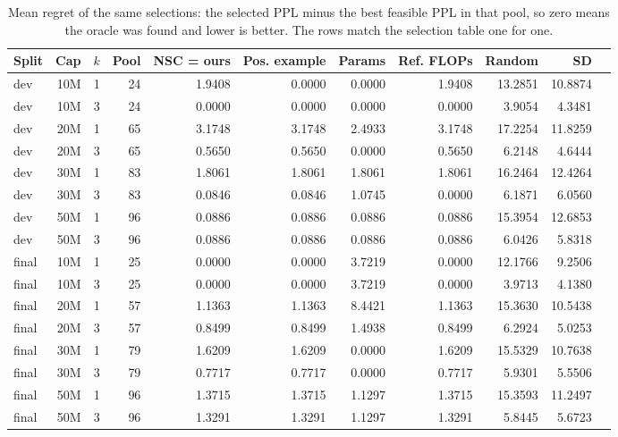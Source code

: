 \begin{table}[t]
\centering
\small
\caption{Mean regret of the same selections: the selected PPL minus the best feasible PPL in that pool, so zero means the oracle was found and lower is better. The rows match the selection table one for one.}
\label{tab:table3b}
\setlength{\tabcolsep}{4pt}
\begin{tabular}{lrrrrrrrrrr}
\toprule
Split & Cap & $k$ & Pool & NSC = ours & Pos. example & Params & Ref. FLOPs & Random & SD \\
\midrule
dev & 10M & 1 & 24 & 1.9408 & 0.0000 & 0.0000 & 1.9408 & 13.2851 & 10.8874 \\
dev & 10M & 3 & 24 & 0.0000 & 0.0000 & 0.0000 & 0.0000 & 3.9054 & 4.3481 \\
dev & 20M & 1 & 65 & 3.1748 & 3.1748 & 2.4933 & 3.1748 & 17.2254 & 11.8259 \\
dev & 20M & 3 & 65 & 0.5650 & 0.5650 & 0.0000 & 0.5650 & 6.2148 & 4.6444 \\
dev & 30M & 1 & 83 & 1.8061 & 1.8061 & 1.8061 & 1.8061 & 16.2464 & 12.4264 \\
dev & 30M & 3 & 83 & 0.0846 & 0.0846 & 1.0745 & 0.0000 & 6.1871 & 6.0560 \\
dev & 50M & 1 & 96 & 0.0886 & 0.0886 & 0.0886 & 0.0886 & 15.3954 & 12.6853 \\
dev & 50M & 3 & 96 & 0.0886 & 0.0886 & 0.0886 & 0.0886 & 6.0426 & 5.8318 \\
final & 10M & 1 & 25 & 0.0000 & 0.0000 & 3.7219 & 0.0000 & 12.1766 & 9.2506 \\
final & 10M & 3 & 25 & 0.0000 & 0.0000 & 3.7219 & 0.0000 & 3.9713 & 4.1380 \\
final & 20M & 1 & 57 & 1.1363 & 1.1363 & 8.4421 & 1.1363 & 15.3630 & 10.5438 \\
final & 20M & 3 & 57 & 0.8499 & 0.8499 & 1.4938 & 0.8499 & 6.2924 & 5.0253 \\
final & 30M & 1 & 79 & 1.6209 & 1.6209 & 0.0000 & 1.6209 & 15.5329 & 10.7638 \\
final & 30M & 3 & 79 & 0.7717 & 0.7717 & 0.0000 & 0.7717 & 5.9301 & 5.5506 \\
final & 50M & 1 & 96 & 1.3715 & 1.3715 & 1.1297 & 1.3715 & 15.3593 & 11.2497 \\
final & 50M & 3 & 96 & 1.3291 & 1.3291 & 1.1297 & 1.3291 & 5.8445 & 5.6723 \\
\bottomrule
\end{tabular}
\end{table}
